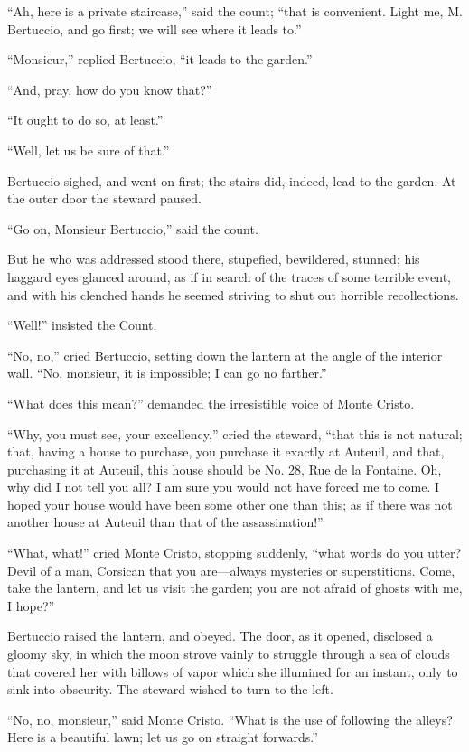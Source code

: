 “Ah, here is a private staircase,” said the count; “that is convenient.
Light me, M. Bertuccio, and go first; we will see where it leads to.”

“Monsieur,” replied Bertuccio, “it leads to the garden.”

“And, pray, how do you know that?”

“It ought to do so, at least.”

“Well, let us be sure of that.”

Bertuccio sighed, and went on first; the stairs did, indeed, lead to
the garden. At the outer door the steward paused.

“Go on, Monsieur Bertuccio,” said the count.

But he who was addressed stood there, stupefied, bewildered, stunned;
his haggard eyes glanced around, as if in search of the traces of some
terrible event, and with his clenched hands he seemed striving to shut
out horrible recollections.

“Well!” insisted the Count.

“No, no,” cried Bertuccio, setting down the lantern at the angle of the
interior wall. “No, monsieur, it is impossible; I can go no farther.”

“What does this mean?” demanded the irresistible voice of Monte Cristo.

“Why, you must see, your excellency,” cried the steward, “that this is
not natural; that, having a house to purchase, you purchase it exactly
at Auteuil, and that, purchasing it at Auteuil, this house should be
No. 28, Rue de la Fontaine. Oh, why did I not tell you all? I am sure
you would not have forced me to come. I hoped your house would have
been some other one than this; as if there was not another house at
Auteuil than that of the assassination!”

“What, what!” cried Monte Cristo, stopping suddenly, “what words do you
utter? Devil of a man, Corsican that you are—always mysteries or
superstitions. Come, take the lantern, and let us visit the garden; you
are not afraid of ghosts with me, I hope?”

Bertuccio raised the lantern, and obeyed. The door, as it opened,
disclosed a gloomy sky, in which the moon strove vainly to struggle
through a sea of clouds that covered her with billows of vapor which
she illumined for an instant, only to sink into obscurity. The steward
wished to turn to the left.

“No, no, monsieur,” said Monte Cristo. “What is the use of following
the alleys? Here is a beautiful lawn; let us go on straight forwards.”

